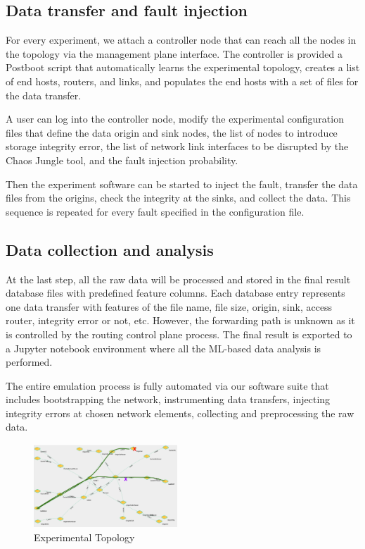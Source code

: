 \subsection{Data transfer and fault injection}
For every experiment, we attach a controller node that can reach all the nodes in the topology via the management plane interface. The controller is provided a Postboot script that automatically learns the experimental topology, creates a list of end hosts, routers, and links, and populates the end hosts with a set of files for the data transfer.

A user can log into the controller node, modify the experimental configuration files that define the data origin and sink nodes, the list of nodes to introduce storage integrity error, the list of network link interfaces to be disrupted by the Chaos Jungle tool, and the fault injection probability.

Then the experiment software can be started to inject the fault, transfer the data files from the origins, check the integrity at the sinks, and collect the data. This sequence is repeated for every fault specified in the configuration file.

\subsection{Data collection and analysis}
At the last step, all the raw data will be processed and stored in the final result database files with predefined feature columns. Each database entry represents one data transfer with features of the file name, file size, origin, sink, access router, integrity error or not, etc. However, the forwarding path is unknown as it is controlled by the routing control plane process. The final result is exported to a Jupyter notebook environment where all the ML-based data analysis is performed.

The entire emulation process is fully automated via our software suite that includes bootstrapping the network, instrumenting data transfers, injecting integrity errors at chosen network elements, collecting and preprocessing the raw data. 

\begin{figure}[!ht]
\begin{center}
\includegraphics[width=0.48\textwidth]{./figure/ChaosJungle}
\end{center}
\caption{Experimental Topology}
\label{fig:topology}
\end{figure}

